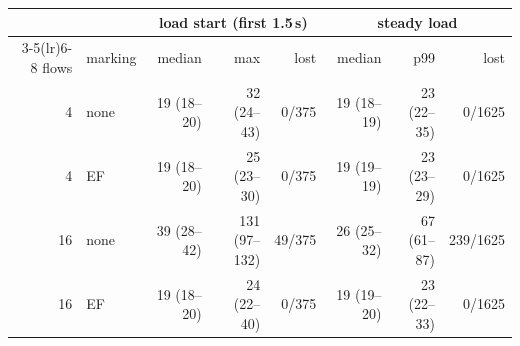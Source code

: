 \begin{tabular}{rl rrr rrr}
\toprule
& & \multicolumn{3}{c}{load start (first 1.5\,s)} & \multicolumn{3}{c}{steady load} \\
\cmidrule(lr){3-5}\cmidrule(lr){6-8}
flows & marking & median & max & lost & median & p99 & lost \\
\midrule
4 & none & 19 (18--20) & 32 (24--43) & 0/375 & 19 (18--19) & 23 (22--35) & 0/1625 \\
4 & EF & 19 (18--20) & 25 (23--30) & 0/375 & 19 (19--19) & 23 (23--29) & 0/1625 \\
16 & none & 39 (28--42) & 131 (97--132) & 49/375 & 26 (25--32) & 67 (61--87) & 239/1625 \\
16 & EF & 19 (18--20) & 24 (22--40) & 0/375 & 19 (19--20) & 23 (22--33) & 0/1625 \\
\bottomrule
\end{tabular}